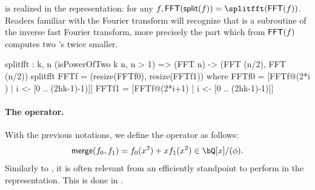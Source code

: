  \begin{algorithm}%
 \caption{$\splitfft(\fft(f))$}\label{alg:splitfft}
  \begin{algorithmic}[1]
  \EndFor
  \end{algorithmic}
 \end{algorithm}

 \splitfft is \polsplit realized in the \fft representation: for any $f, \fft(\polsplit(f)) = \splitfft(\fft(f))$. Readers familiar with the Fourier transform will recognize that \splitfft is a subroutine of the inverse fast Fourier transform, more precisely the part which from $\textsf{FFT}(f)$ computes two \fft's twice smaller.

\begin{code}
  splitfft : {k, n} (isPowerOfTwo k n, n > 1) =>
    (FFT n) -> (FFT (n/2), FFT (n/2))
  splitfft FFTf = (resize(FFTf0), resize(FFTf1)) where
    FFTf0 = [FFTf@(2*i  ) | i <- [0 .. (2^^(k-1)-1)]]
    FFTf1 = [FFTf@(2*i+1) | i <- [0 .. (2^^(k-1)-1)]]
\end{code}

 \paragraph{The \mergefft operator.} With the previous notations, we define the operator \polmerge as follows:
 \begin{equation}\label{eq:merge}
 \polmerge(f_0,f_1) = f_0(x^2) + xf_1(x^2) \in \bQ[x]/(\phi).
 \end{equation}
 Similarly to \polsplit, it is often relevant from an efficiently standpoint to perform \polmerge in the \fft representation. This is done in \longmergefft.

 \begin{algorithm}%
 \caption{$\mergefft(f_0,f_1)$}\label{alg:mergefft}
  \begin{algorithmic}[1]
  \EndFor
  \end{algorithmic}
 \end{algorithm}

